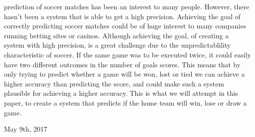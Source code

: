 \documentclass[10pt,journal,compsoc]{IEEEtran}
\begin{document}
% 
% 
% 
% 
 prediction of soccer matches has been an interest to many people. However, there hasn’t been a system that is able to get a high precision. 
Achieving the goal of correctly predicting soccer matches could be of huge interest to many companies running betting sites or casinos. Although achieving the goal, of creating a system with high precision, is a great challenge due to the unpredictablility characteristic of soccer. If the same game was to be executed twice, it could easily have two different outcomes in the number of goals scores. This means that by only trying to predict whether a game will be won, lost or tied we can achieve a higher accuracy than predicting the score, and could make such a system plausible for achieving a higher accuracy. This is what we will attempt in this paper, to create a system that predicts if the home team will win, lose or draw a game.


 
\hfill May 9th, 2017



%
%
\end{document}
